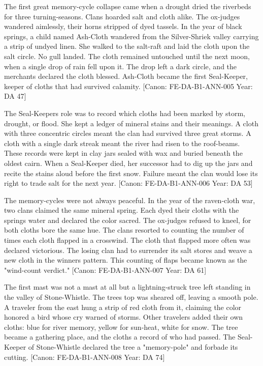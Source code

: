 The first great memory-cycle collapse came when a drought dried the
riverbeds for three turning-seasons. Clans hoarded salt and cloth alike.
The ox-judges wandered aimlessly, their horns stripped of dyed tassels.
In the year of black springs, a child named Ash-Cloth wandered from the
Silver-Shriek valley carrying a strip of undyed linen. She walked to the
salt-raft and laid the cloth upon the salt circle. No gull landed. The
cloth remained untouched until the next moon, when a single drop of rain
fell upon it. The drop left a dark circle, and the merchants declared
the cloth blessed. Ash-Cloth became the first Seal-Keeper, keeper of
cloths that had survived calamity. {[}Canon: FE-DA-B1-ANN-005 \textbar{}
Year: DA 47{]}

The Seal-Keeper\textquotesingle s role was to record which cloths had
been marked by storm, drought, or flood. She kept a ledger of mineral
stains and their meanings. A cloth with three concentric circles meant
the clan had survived three great storms. A cloth with a single dark
streak meant the river had risen to the roof-beams. These records were
kept in clay jars sealed with wax and buried beneath the oldest cairn.
When a Seal-Keeper died, her successor had to dig up the jars and recite
the stains aloud before the first snow. Failure meant the clan would
lose its right to trade salt for the next year. {[}Canon:
FE-DA-B1-ANN-006 \textbar{} Year: DA 53{]}

The memory-cycles were not always peaceful. In the year of the
raven-cloth war, two clans claimed the same mineral spring. Each dyed
their cloths with the spring\textquotesingle s water and declared the
color sacred. The ox-judges refused to kneel, for both cloths bore the
same hue. The clans resorted to counting the number of times each cloth
flapped in a crosswind. The cloth that flapped more often was declared
victorious. The losing clan had to surrender its salt stores and weave a
new cloth in the winner\textquotesingle s pattern. This counting of
flaps became known as the "wind-count verdict." {[}Canon:
FE-DA-B1-ANN-007 \textbar{} Year: DA 61{]}

The first mast was not a mast at all but a lightning-struck tree left
standing in the valley of Stone-Whistle. The tree\textquotesingle s top
was sheared off, leaving a smooth pole. A traveler from the east hung a
strip of red cloth from it, claiming the color honored a bird whose cry
warned of storms. Other travelers added their own cloths: blue for river
memory, yellow for sun-heat, white for snow. The tree became a gathering
place, and the cloths a record of who had passed. The Seal-Keeper of
Stone-Whistle declared the tree a "memory-pole" and forbade its cutting.
{[}Canon: FE-DA-B1-ANN-008 \textbar{} Year: DA 74{]}

